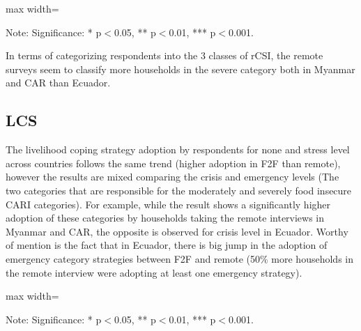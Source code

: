\documentclass[11pt,harvard]{article}
\begin{document}
\begin{table}[htbp]
	\centering
	\begin{adjustbox}{max width=\textwidth}
		\begin{threeparttable}
			\caption{Impact of Survey Modality on Reduced Coping Strategy Index Classification}
			\scriptsize
			 
			\label{tab:rCSI_Modality_All_Country}
			\begin{tablenotes}
				\item Note: Significance: * p$<$0.05, ** p$<$0.01, *** p$<$0.001. 
			\end{tablenotes}
		\end{threeparttable}
	\end{adjustbox}
\end{table}

In terms of categorizing respondents into the 3 classes of rCSI, the remote surveys seem to classify more households in the severe category both in Myanmar and CAR than Ecuador.

	\pagebreak

\subsection{LCS}

The livelihood coping strategy adoption by respondents for none and stress level across countries follows the same trend (higher adoption in F2F than remote), however the results are mixed comparing the crisis and emergency levels (The two categories that are responsible for the moderately and severely food insecure CARI categories). For example, while the result shows a significantly higher adoption of these categories by households taking the remote interviews in Myanmar and CAR, the opposite is observed for crisis level in Ecuador. Worthy of mention is the fact that in Ecuador, there is big jump in the adoption of emergency category strategies between F2F and remote (50\% more households in the remote interview were adopting at least one emergency strategy). 

\begin{table}[htbp]
	\centering
	\begin{adjustbox}{max width=\textwidth}
		\begin{threeparttable}
			\caption{Impact of Survey Modality on Livelihood Coping Strategy Index}
			\scriptsize
			 
			\label{tab:LCS_Modality_All_Country}
			\begin{tablenotes}
				\item Note: Significance: * p$<$0.05, ** p$<$0.01, *** p$<$0.001. 
			\end{tablenotes}
		\end{threeparttable}
	\end{adjustbox}
\end{table}
\end{document}
